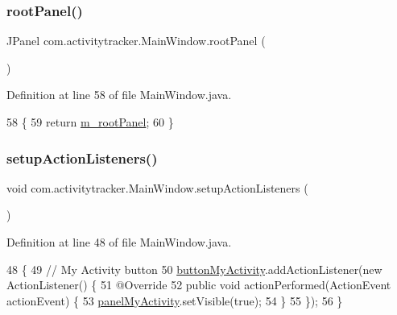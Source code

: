 \subsubsection{\texorpdfstring{root\+Panel()}{rootPanel()}}
{\footnotesize\ttfamily J\+Panel com.\+activitytracker.\+Main\+Window.\+root\+Panel (\begin{DoxyParamCaption}{ }\end{DoxyParamCaption})\hspace{0.3cm}{\ttfamily [package]}}



Definition at line 58 of file Main\+Window.\+java.


\begin{DoxyCode}
58                        \{
59         \textcolor{keywordflow}{return} \mbox{\hyperlink{classcom_1_1activitytracker_1_1_main_window_ac3d61c032aef87f12b1ae6f7dbf482c3}{m\_rootPanel}};
60     \}
\end{DoxyCode}
\mbox{\label{classcom_1_1activitytracker_1_1_main_window_a76b3e8567b228ccd26f09c15ebaddb72}} 
\subsubsection{\texorpdfstring{setup\+Action\+Listeners()}{setupActionListeners()}}
{\footnotesize\ttfamily void com.\+activitytracker.\+Main\+Window.\+setup\+Action\+Listeners (\begin{DoxyParamCaption}{ }\end{DoxyParamCaption})\hspace{0.3cm}{\ttfamily [private]}}



Definition at line 48 of file Main\+Window.\+java.


\begin{DoxyCode}
48                                         \{
49         \textcolor{comment}{// My Activity button}
50         \mbox{\hyperlink{classcom_1_1activitytracker_1_1_main_window_adec15801f8e16f769bd954e351a663fa}{buttonMyActivity}}.addActionListener(\textcolor{keyword}{new} ActionListener() \{
51             @Override
52             \textcolor{keyword}{public} \textcolor{keywordtype}{void} actionPerformed(ActionEvent actionEvent) \{
53                 \mbox{\hyperlink{classcom_1_1activitytracker_1_1_main_window_a89833c824727a496f4a889177d4d3f3c}{panelMyActivity}}.setVisible(\textcolor{keyword}{true});
54             \}
55         \});
56     \}
\end{DoxyCode}
\mbox{\label{classcom_1_1activitytracker_1_1_main_window_a53a019623a37b950473359fc625b6423}} 
